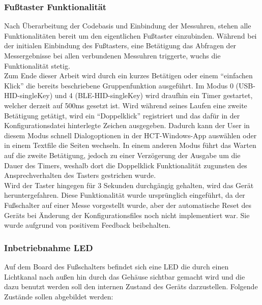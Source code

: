\subsubsection{Fußtaster Funktionalität}
\label{FußtasterFunktionalität}
Nach Überarbeitung der Codebasis und Einbindung der Messuhren, stehen alle Funktionalitäten bereit um den eigentlichen Fußtaster einzubinden. Während bei der initialen Einbindung des Fußtasters, eine Betätigung das Abfragen der Messergebnisse bei allen verbundenen Messuhren triggerte, wuchs die Funktionalität stetig.\\
Zum Ende dieser Arbeit wird durch ein kurzes Betätigen oder einem ``einfachen Klick'' die bereits beschriebene Gruppenfunktion ausgeführt. Im Modus 0 (USB-\ac{HID}-singleKey) und 4 (\ac{BLE}-\ac{HID}-singleKey) wird draufhin ein Timer gestartet, welcher derzeit auf 500ms gesetzt ist. Wird während seines Laufen eine zweite Betätigung getätigt, wird ein ``Doppelklick'' registriert und das dafür in der Konfigurationsdatei hinterlegte Zeichen ausgegeben. Dadurch kann der User in diesem Modus schnell Dialogoptionen in der \ac{HCT}-Windows-App auswählen oder in einem Textfile die Seiten wechseln. In einem anderen Modus führt das Warten auf die zweite Betätigung, jedoch zu einer Verzögerung der Ausgabe um die Dauer des Timers, weshalb dort die Doppelklick Funktionalität zugunsten des Ansprechverhalten des Tasters gestrichen wurde.\\
Wird der Taster hingegen für 3 Sekunden durchgängig gehalten, wird das Gerät heruntergefahren. Diese Funktionalität wurde ursprünglich eingeführt, da der Fußschalter auf einer Messe vorgestellt wurde, aber der automatische Reset des Geräts bei Änderung der Konfigurationsfiles noch nicht implementiert war. Sie wurde aufgrund von positivem Feedback beibehalten.

\subsubsection{Inbetriebnahme LED}
Auf dem Board des Fußschalters befindet sich eine \ac{LED} die durch einen Lichtkanal nach außen hin durch das Gehäuse sichtbar gemacht wird und die dazu benutzt werden soll den internen Zustand des Geräts darzustellen. Folgende Zustände sollen abgebildet werden: 

